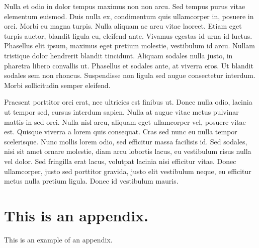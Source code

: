 \documentclass{icldt}
\begin{document}
Nulla et odio in dolor tempus maximus non non arcu. Sed tempus purus vitae elementum euismod. Duis nulla ex, condimentum quis ullamcorper in, posuere in orci. Morbi eu magna turpis. Nulla aliquam ac arcu vitae laoreet. Etiam eget turpis auctor, blandit ligula eu, eleifend ante. Vivamus egestas id urna id luctus. Phasellus elit ipsum, maximus eget pretium molestie, vestibulum id arcu. Nullam tristique dolor hendrerit blandit tincidunt. Aliquam sodales nulla justo, in pharetra libero convallis ut. Phasellus et sodales ante, at viverra eros. Ut blandit sodales sem non rhoncus. Suspendisse non ligula sed augue consectetur interdum. Morbi sollicitudin semper eleifend.

Praesent porttitor orci erat, nec ultricies est finibus ut. Donec nulla odio, lacinia ut tempor sed, cursus interdum sapien. Nulla at augue vitae metus pulvinar mattis in sed orci. Nulla nisl arcu, aliquam eget ullamcorper vel, posuere vitae est. Quisque viverra a lorem quis consequat. Cras sed nunc eu nulla tempor scelerisque. Nunc mollis lorem odio, sed efficitur massa facilisis id. Sed sodales, nisi sit amet ornare molestie, diam arcu lobortis lacus, eu vestibulum risus nulla vel dolor. Sed fringilla erat lacus, volutpat lacinia nisi efficitur vitae. Donec ullamcorper, justo sed porttitor gravida, justo elit vestibulum neque, eu efficitur metus nulla pretium ligula. Donec id vestibulum mauris.






\appendix

\chapter{This is an appendix.}
This is an example of an appendix.
\end{document}
